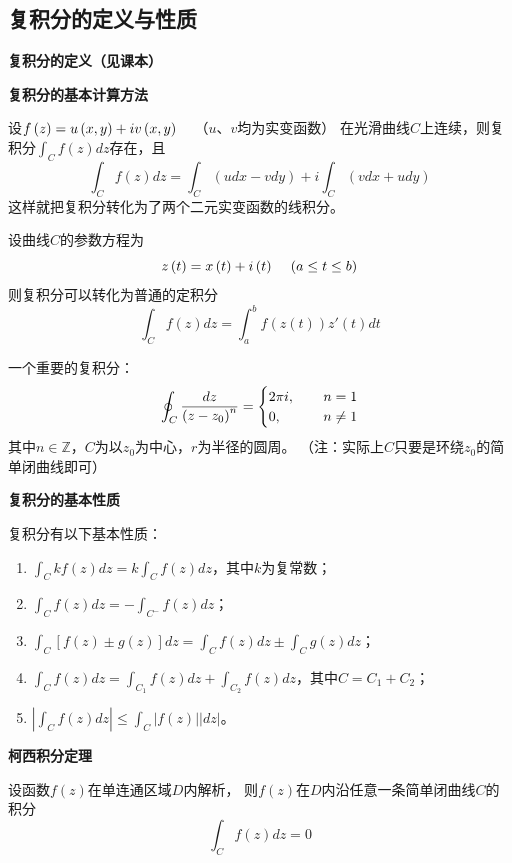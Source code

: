 \documentclass[a4paper,12pt]{article}
\begin{document}
\subsection{复积分的定义与性质}

\noindent
\textbf{复积分的定义（见课本）}

\noindent
\textbf{复积分的基本计算方法}

设$f\left(z\right)=u\left(x,y\right)+iv\left(x,y\right)\kern12pt$（$u$、$v$均为实变函数）
在光滑曲线$C$上连续，则复积分$\int_Cf\left(z\right)dz$存在，且
$$
\int_Cf\left(z\right)dz=\int_C\left(udx-vdy\right)+i\int_C\left(vdx+udy\right)
$$
这样就把复积分转化为了两个二元实变函数的线积分。

设曲线$C$的参数方程为
$$
z\left(t\right)=x\left(t\right)+i\left(t\right)\kern 12pt\left(a\le t\le b\right)
$$
则复积分可以转化为普通的定积分
$$
\int_Cf\left(z\right)dz=\int_a^bf\left(z\left(t\right)\right)z'\left(t\right)dt
$$

一个重要的复积分：
$$
\oint_C\frac{dz}{\left(z-z_0\right)^n}=
\begin{cases}
    2\pi i, & \kern12pt n=1 \\
    0,      & \kern12pt n\ne1
\end{cases}
$$
其中$n\in\mathbb{Z}$，$C$为以$z_0$为中心，$r$为半径的圆周。
（注：实际上$C$只要是环绕$z_0$的简单闭曲线即可）

\noindent
\textbf{复积分的基本性质}

复积分有以下基本性质：
\begin{enumerate}
    \item $\int_Ckf\left(z\right)dz=k\int_Cf\left(z\right)dz$，其中$k$为复常数；
    \item $\int_Cf\left(z\right)dz=-\int_{C^-}f\left(z\right)dz$；
    \item $\int_C\left[f\left(z\right)\pm g\left(z\right)\right]dz=\int_Cf\left(z\right)dz\pm\int_Cg\left(z\right)dz$；
    \item $\int_Cf\left(z\right)dz=\int_{C_1}f\left(z\right)dz+\int_{C_2}f\left(z\right)dz$，其中$C=C_1+C_2$；
    \item $\left|\int_Cf\left(z\right)dz\right|\le\int_C\left|f\left(z\right)\right|\left|dz\right|$。
\end{enumerate}

\noindent
\textbf{柯西积分定理}

设函数$f\left(z\right)$在单连通区域$D$内解析，
则$f\left(z\right)$在$D$内沿任意一条简单闭曲线$C$的积分
$$
\int_Cf\left(z\right)dz=0
$$
\end{document}
